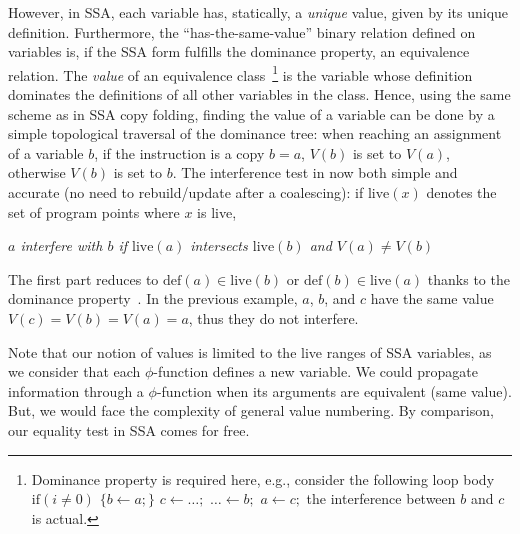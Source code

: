 However, in SSA, each variable has, statically, a \emph{unique} value, given by its unique
definition.  Furthermore, the ``has-the-same-value'' binary relation defined on
variables is, if the SSA form fulfills the dominance property, an equivalence relation.  
The \emph{value} of an equivalence class~\footnote{Dominance property is required here, e.g., consider the following loop body $\textrm{if}(i\neq 0)$ $\{b\gets a;\}$ $c\gets\dots;$ $\dots\gets b;$ $a\gets c;$ the interference between $b$ and $c$ is actual.} 
is the variable whose definition
dominates the definitions of all other variables in the class.
Hence, using the same scheme as in SSA copy folding, finding the value of a
variable can be done by a simple topological traversal of the dominance tree:
when reaching an assignment of a variable $b$, if the instruction is a copy
$b=a$, $V(b)$ is set to $V(a)$, otherwise $V(b)$ is set to $b$. The
interference test in now both simple and accurate (no need to rebuild/update
after a coalescing): if $\textrm{live}(x)$ denotes the set of program points
where $x$ is live, 

\centerline{\emph{$a$ interfere with $b$ if $\textrm{live}(a)$ intersects
  $\textrm{live}(b)$ and $V(a)\neq V(b)$}}

  The first part reduces to
$\textrm{def}(a)\in \textrm{live}(b)$ or $\textrm{def}(b)\in \textrm{live}(a)$
thanks to the dominance property\ifhab~\cite{liverange.pldi02}\fi. In the previous
example, $a$, $b$, and $c$ have the same value $V(c)=V(b)=V(a)=a$, thus they do
not interfere.

Note that our notion of values is limited to the live ranges of SSA
variables, as we consider that each $\phi$-function defines a new variable. We
could propagate information through a $\phi$-function when its arguments are
equivalent (same value). But, we would face the complexity of general value
numbering. By comparison, our equality test in SSA comes for free.

